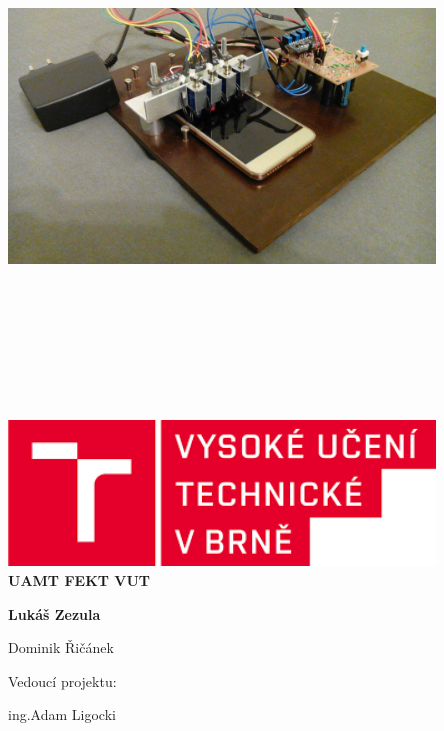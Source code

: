 \begin{titlepage}
    \begin{center}

	~\\[0.5cm]
       \includegraphics[width=0.85\textwidth]{./img/uvodka.jpg}\\[0cm] 

	~\\[2cm]

    \HRule \\[0.4cm]
    { \huge \bfseries \projectname}\\[0.4cm]
       \textsc{\LARGE \projectsubname}\\[0.4cm]
    \HRule \\[1cm]
    
    \textsc{\LARGE \projectdoc}\\[0.5cm]
    \texttt{\Large \gitFirstTagDescribe}\\[1.5cm]

    \begin{minipage}{0.5\textwidth}
      \begin{center} \large
        \includegraphics[width=0.85\textwidth]{./img/loga/vut.png}\\[1cm] 
		 \Large\bfseries UAMT FEKT VUT		
      \end{center}
    \end{minipage}%
    \begin{minipage}{0.5\textwidth}\raggedleft\Large\bfseries
 	Lukáš Zezula\par
        Dominik Řičánek\par
    \raggedright    
        Vedoucí projektu: \par
   \raggedleft     
        ing.Adam Ligocki
    \end{minipage}
    \vfill
   \end{center}
\end{titlepage}